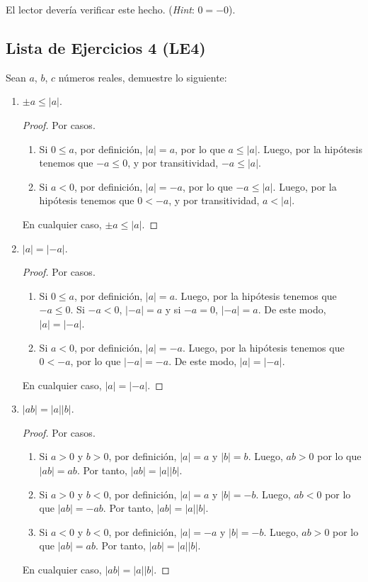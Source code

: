 \documentclass[11pt]{article}
\begin{document}
El lector devería verificar este hecho. (\textit{Hint}: $0=-0$).

\subsection*{Lista de Ejercicios 4 (LE4)}

Sean $a$, $b$, $c$ números reales, demuestre lo siguiente:

\begin{enumerate}[label=\alph*)]
\item $\pm a\leq |a|$.

\begin{proof}
 Por casos.
 \begin{enumerate}[label=\roman*)]
  \item Si $0 \leq a$, por definición, $|a|=a$, por lo que $a\leq |a|$. Luego, por la hipótesis tenemos que $-a \leq 0$, y por transitividad, $-a\leq |a|$.
  \item Si $a<0$, por definición, $|a|=-a$, por lo que $-a\leq |a|$. Luego, por la hipótesis tenemos que $0<-a$, y por transitividad, $a<|a|$.
 \end{enumerate}
 En cualquier caso, $\pm a\leq |a|$.
\end{proof} 

\item $|a|=|-a|$.
\begin{proof}
 Por casos.
 \begin{enumerate}[label=\roman*)]
  \item Si $0 \leq a$, por definición, $|a|=a$. Luego, por la hipótesis tenemos que $-a \leq 0$. Si $-a<0$, $|-a|=a$ y si $-a=0$, $|-a|=a$. De este modo, $|a|=|-a|$.
  \item Si $a<0$, por definición, $|a|=-a$. Luego, por la hipótesis tenemos que $0<-a$, por lo que $|-a|=-a$. De este modo, $|a|=|-a|$.
 \end{enumerate}
 En cualquier caso, $|a|=|-a|$.
\end{proof}

\item $|ab|=|a||b|$.

\begin{proof}
 Por casos.
 \begin{enumerate}[label=\roman*)]
  \item Si $a>0$ y $b>0$, por definición, $|a|=a$ y $|b|=b$. Luego, $ab>0$ por lo que $|ab|=ab$. Por tanto, $|ab| =|a||b|$.
  \item Si $a>0$ y $b<0$, por definición, $|a|=a$ y $|b|=-b$. Luego, $ab<0$ por lo que $|ab|=-ab$. Por tanto, $|  ab|=|a||b|$.
  \item Si $a<0$ y $b<0$, por definición, $|a|=-a$ y $|b|=-b$. Luego, $ab>0$ por lo que $|ab|=ab$. Por tanto, $|  ab|=|a||b|$.
 \end{enumerate}
 En cualquier caso, $|ab|=|a||b|$.
\end{proof}


\end{enumerate}
\end{document}
